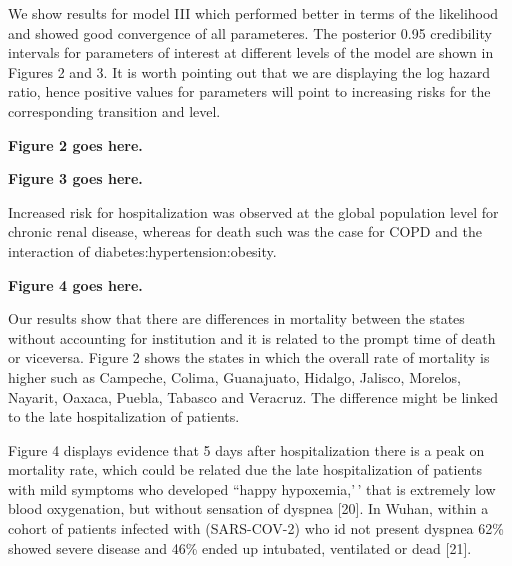 \documentclass[10pt,letterpaper]{article}
\begin{document}
We show results for model III which performed better in terms of the
likelihood and showed good convergence of all parameteres. The posterior
0.95 credibility intervals for parameters of interest at different
levels of the model are shown in Figures 2 and 3. It is worth pointing
out that we are displaying the log hazard ratio, hence positive values
for parameters will point to increasing risks for the corresponding
transition and level.

\vspace{5mm}

\begin{center}
\textbf{Figure 2 goes here.}
\end{center}

\vspace{5mm}

\begin{center}
\textbf{Figure 3 goes here.}
\end{center}

\vspace{5mm}

Increased risk for hospitalization was observed at the global population
level for chronic renal disease, whereas for death such was the case for
COPD and the interaction of diabetes:hypertension:obesity.

\vspace{5mm}

\begin{center}
\textbf{Figure 4 goes here.}
\end{center}

\vspace{5mm}

Our results show that there are differences in mortality between the
states without accounting for institution and it is related to the
prompt time of death or viceversa. Figure 2 shows the states in which
the overall rate of mortality is higher such as Campeche, Colima,
Guanajuato, Hidalgo, Jalisco, Morelos, Nayarit, Oaxaca, Puebla, Tabasco
and Veracruz. The difference might be linked to the late hospitalization
of patients.

Figure 4 displays evidence that 5 days after hospitalization there is a
peak on mortality rate, which could be related due the late
hospitalization of patients with mild symptoms who developed ``happy
hypoxemia,'\,' that is extremely low blood oxygenation, but without
sensation of dyspnea {[}20{]}. In Wuhan, within a cohort of patients
infected with (SARS-COV-2) who id not present dyspnea 62\% showed severe
disease and 46\% ended up intubated, ventilated or dead {[}21{]}.
\end{document}
